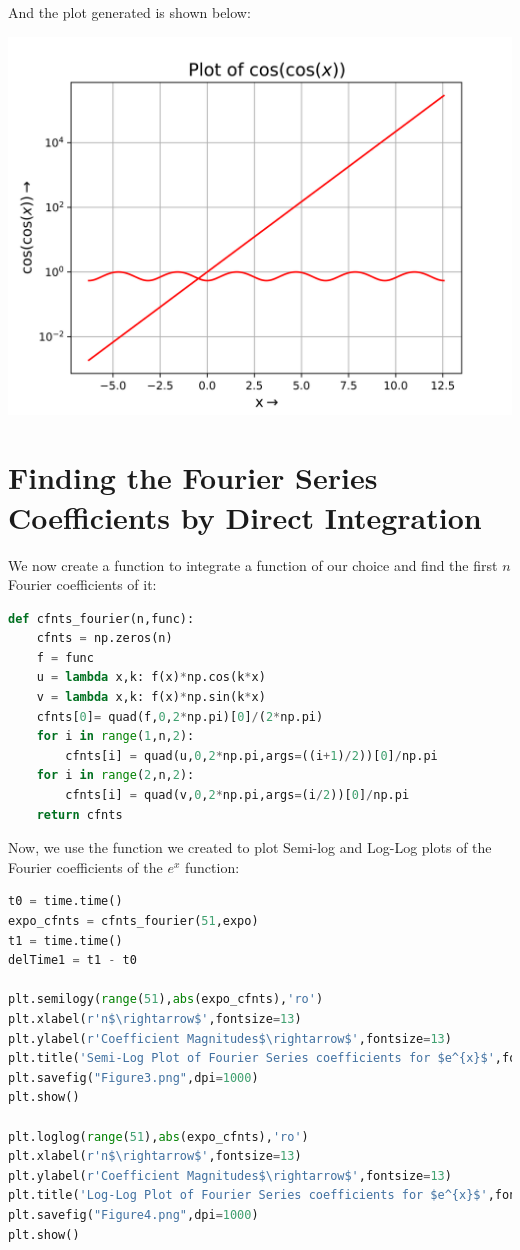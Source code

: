 \documentclass[12pt]{article}
\begin{document}
And the plot generated is shown below:

\begin{center}
    \includegraphics[scale=0.8]{images/Figure2.png}
\end{center}

\pagebreak
\section{Finding the Fourier Series Coefficients by Direct Integration}

We now create a function to integrate a function of our choice and find the first $n$ Fourier coefficients of it:

\begin{lstlisting}[language=Python]
def cfnts_fourier(n,func):
    cfnts = np.zeros(n)
    f = func
    u = lambda x,k: f(x)*np.cos(k*x)
    v = lambda x,k: f(x)*np.sin(k*x)
    cfnts[0]= quad(f,0,2*np.pi)[0]/(2*np.pi)
    for i in range(1,n,2):
        cfnts[i] = quad(u,0,2*np.pi,args=((i+1)/2))[0]/np.pi
    for i in range(2,n,2):
        cfnts[i] = quad(v,0,2*np.pi,args=(i/2))[0]/np.pi
    return cfnts
\end{lstlisting}

\bigskip
\bigskip
Now, we use the function we created to plot Semi-log and Log-Log plots of the Fourier coefficients of the $e^x$ function:

\begin{lstlisting}[language=Python]
t0 = time.time()
expo_cfnts = cfnts_fourier(51,expo)
t1 = time.time()
delTime1 = t1 - t0

plt.semilogy(range(51),abs(expo_cfnts),'ro')
plt.xlabel(r'n$\rightarrow$',fontsize=13)
plt.ylabel(r'Coefficient Magnitudes$\rightarrow$',fontsize=13)
plt.title('Semi-Log Plot of Fourier Series coefficients for $e^{x}$',fontsize=16)
plt.savefig("Figure3.png",dpi=1000)
plt.show()

plt.loglog(range(51),abs(expo_cfnts),'ro')
plt.xlabel(r'n$\rightarrow$',fontsize=13)
plt.ylabel(r'Coefficient Magnitudes$\rightarrow$',fontsize=13)
plt.title('Log-Log Plot of Fourier Series coefficients for $e^{x}$',fontsize=16)
plt.savefig("Figure4.png",dpi=1000)
plt.show()
\end{lstlisting}
\end{document}
